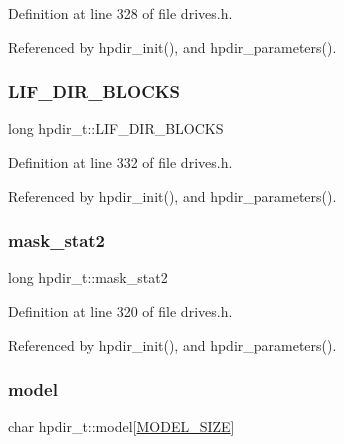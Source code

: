 Definition at line 328 of file drives.\+h.



Referenced by hpdir\+\_\+init(), and hpdir\+\_\+parameters().

\mbox{\label{structhpdir__t_a8b6c34460bb1c291860bbb82c56660a4}} 
\subsubsection{\texorpdfstring{L\+I\+F\+\_\+\+D\+I\+R\+\_\+\+B\+L\+O\+C\+KS}{LIF\_DIR\_BLOCKS}}
{\footnotesize\ttfamily long hpdir\+\_\+t\+::\+L\+I\+F\+\_\+\+D\+I\+R\+\_\+\+B\+L\+O\+C\+KS}



Definition at line 332 of file drives.\+h.



Referenced by hpdir\+\_\+init(), and hpdir\+\_\+parameters().

\mbox{\label{structhpdir__t_a788d1032b8ff695092f9e4ff4cf36adf}} 
\subsubsection{\texorpdfstring{mask\+\_\+stat2}{mask\_stat2}}
{\footnotesize\ttfamily long hpdir\+\_\+t\+::mask\+\_\+stat2}



Definition at line 320 of file drives.\+h.



Referenced by hpdir\+\_\+init(), and hpdir\+\_\+parameters().

\mbox{\label{structhpdir__t_a3855aafd93d84611573376653f9cd2c0}} 
\subsubsection{\texorpdfstring{model}{model}}
{\footnotesize\ttfamily char hpdir\+\_\+t\+::model\mbox{[}\hyperlink{drives_8h_a3f11d81c1e6d925611a9bdd5115064a0}{M\+O\+D\+E\+L\+\_\+\+S\+I\+ZE}\mbox{]}}



